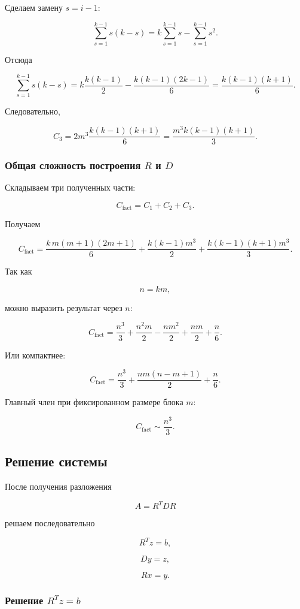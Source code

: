 \documentclass[a4paper,12pt]{article}
\begin{document}
Сделаем замену \(s=i-1\):

$$
\sum_{s=1}^{k-1}s(k-s)
=
k\sum_{s=1}^{k-1}s
-
\sum_{s=1}^{k-1}s^2.
$$

Отсюда

$$
\sum_{s=1}^{k-1}s(k-s)
=
k\frac{k(k-1)}2
-
\frac{k(k-1)(2k-1)}6
=
\frac{k(k-1)(k+1)}6.
$$

Следовательно,

$$
C_3
=
2m^3
\frac{k(k-1)(k+1)}6
=
\frac{m^3k(k-1)(k+1)}3.
$$

\subsubsection{Общая сложность построения \(R\) и \(D\)}

Складываем три полученных части:

$$
C_{\text{fact}}
=
C_1+C_2+C_3.
$$

Получаем

$$
C_{\text{fact}}
=
\frac{k\,m(m+1)(2m+1)}6
+
\frac{k(k-1)m^3}{2}
+
\frac{k(k-1)(k+1)m^3}{3}.
$$

Так как

$$
n=km,
$$

можно выразить результат через \(n\):

$$
C_{\text{fact}}
=
\frac{n^3}{3}
+
\frac{n^2m}{2}
-
\frac{nm^2}{2}
+
\frac{nm}{2}
+
\frac{n}{6}.
$$

Или компактнее:

$$
C_{\text{fact}}
=
\frac{n^3}{3}
+
\frac{nm(n-m+1)}{2}
+
\frac{n}{6}.
$$

Главный член при фиксированном размере блока \(m\):

$$
C_{\text{fact}}
\sim
\frac{n^3}{3}.
$$

\subsection{Решение системы}

После получения разложения

$$
A=R^TDR
$$

решаем последовательно

$$
R^Tz=b,
$$

$$
Dy=z,
$$

$$
Rx=y.
$$

\subsubsection{Решение \(R^Tz=b\)}
\end{document}
